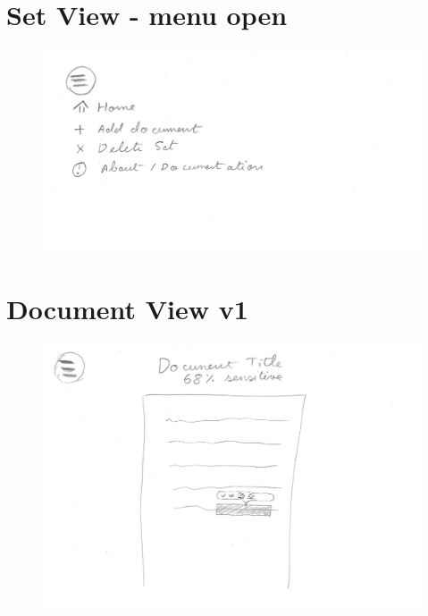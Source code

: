 \documentclass{l4proj}
\begin{document}
\begin{appendices}
    \section{Set View - menu open}
    \begin{figure}[H]
        \centering
        \includegraphics[width=\linewidth]{images/wireframes/set-menu.jpg}
    \end{figure}
    \section{Document View v1}
    \begin{figure}[H]
        \centering
        \includegraphics[width=\linewidth]{images/wireframes/page.png}
    \end{figure}

\end{appendices}
\end{document}
